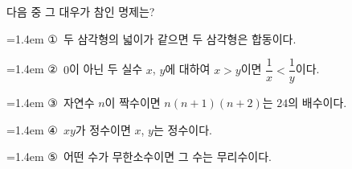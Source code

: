 다음 중 그 대우가 참인 명제는?
\par\medskip\par\noindent\hangindent=1.4em {\small ①}\ 두 삼각형의 넓이가 같으면 두 삼각형은 합동이다.\par\noindent\hangindent=1.4em {\small ②}\ $0$이 아닌 두 실수 $x$, $y$에 대하여 $x>y$이면 $\dfrac{1}{x}<\dfrac{1}{y}$이다.\par\noindent\hangindent=1.4em {\small ③}\ 자연수 $n$이 짝수이면 $n(n+1)(n+2)$는 $24$의 배수이다.\par\noindent\hangindent=1.4em {\small ④}\ $xy$가 정수이면 $x$, $y$는 정수이다.\par\noindent\hangindent=1.4em {\small ⑤}\ 어떤 수가 무한소수이면 그 수는 무리수이다.\par\medskip
